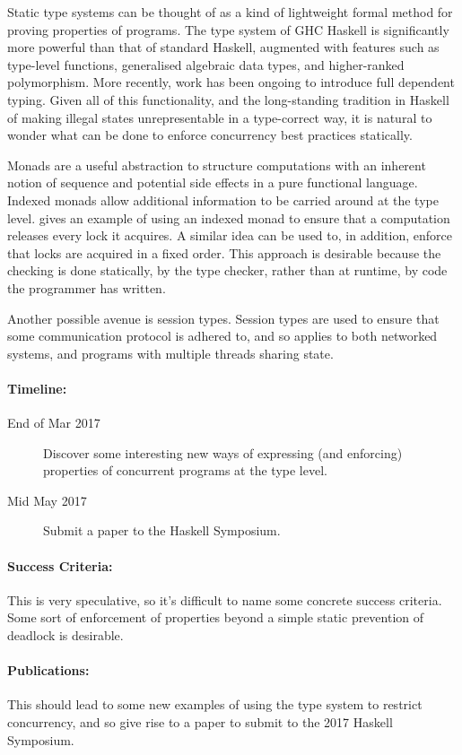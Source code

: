 Static type systems can be thought of as a kind of lightweight formal
method for proving properties of programs. The type system of GHC
Haskell is significantly more powerful than that of standard Haskell,
augmented with features such as type-level functions, generalised
algebraic data types, and higher-ranked polymorphism. More recently,
work has been ongoing to introduce full dependent typing. Given all of
this functionality, and the long-standing tradition in Haskell of
making illegal states unrepresentable in a type-correct way, it is
natural to wonder what can be done to enforce concurrency best
practices statically.

Monads are a useful abstraction to structure computations with an
inherent notion of sequence and potential side effects in a pure
functional language. Indexed monads allow additional information to be
carried around at the type level. \citep{typefun} gives an example of
using an indexed monad to ensure that a computation releases every
lock it acquires. A similar idea can be used to, in addition, enforce
that locks are acquired in a fixed order. This approach is desirable
because the checking is done statically, by the type checker, rather
than at runtime, by code the programmer has written.

Another possible avenue is session types. Session types are used to
ensure that some communication protocol is adhered to, and so applies
to both networked systems, and programs with multiple threads sharing
state.

\paragraph{Timeline:}

\begin{description}
\item[End of Mar 2017] Discover some interesting new ways of
  expressing (and enforcing) properties of concurrent programs at the
  type level.
\item[Mid May 2017] Submit a paper to the Haskell Symposium.
\end{description}

\paragraph{Success Criteria:}

This is very speculative, so it's difficult to name some concrete
success criteria. Some sort of enforcement of properties beyond a
simple static prevention of deadlock is desirable.

\paragraph{Publications:}

This should lead to some new examples of using the type system to
restrict concurrency, and so give rise to a paper to submit to the
2017 Haskell Symposium.
